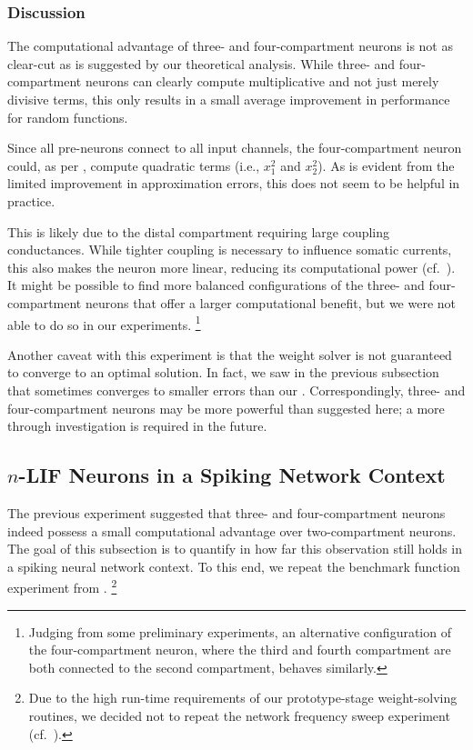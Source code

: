 \subsubsection{Discussion}
The computational advantage of three- and four-compartment neurons is not as clear-cut as is suggested by our theoretical analysis.
While three- and four-compartment neurons can clearly compute multiplicative and not just merely divisive terms, this only results in a small average improvement in performance for random functions.

Since all pre-neurons connect to all input channels, the four-compartment neuron could, as per , compute quadratic terms (i.e., $x_1^2$ and $x_2^2$).
As is evident from the limited improvement in approximation errors, this does not seem to be helpful in practice.

This is likely due to the distal compartment requiring large coupling conductances.
While tighter coupling is necessary to influence somatic currents, this also makes the neuron more linear, reducing its computational power (cf.~).
It might be possible to find more balanced configurations of the three- and four-compartment neurons that offer a larger computational benefit, but we were not able to do so in our experiments.%
\footnote{Judging from some preliminary experiments, an alternative configuration of the four-compartment neuron, where the third and fourth compartment are both connected to the second compartment, behaves similarly.
}

Another caveat with this experiment is that the weight solver is not guaranteed to converge to an optimal solution.
In fact, we saw in the previous subsection that \SGD sometimes converges to smaller errors than our \SQP.
Correspondingly, three- and four-compartment neurons may be more powerful than suggested here; a more through investigation is required in the future.

\subsection{$n$-LIF Neurons in a Spiking Network Context}
\label{sec:nlif_experiment_3}

The previous experiment suggested that three- and four-compartment neurons indeed possess a small computational advantage over two-compartment neurons.
The goal of this subsection is to quantify in how far this observation still holds in a spiking neural network context.
To this end, we repeat the benchmark function experiment from .%
\footnote{
Due to the high run-time requirements of our prototype-stage weight-solving routines, we decided not to repeat the network frequency sweep experiment (cf.~).
}

